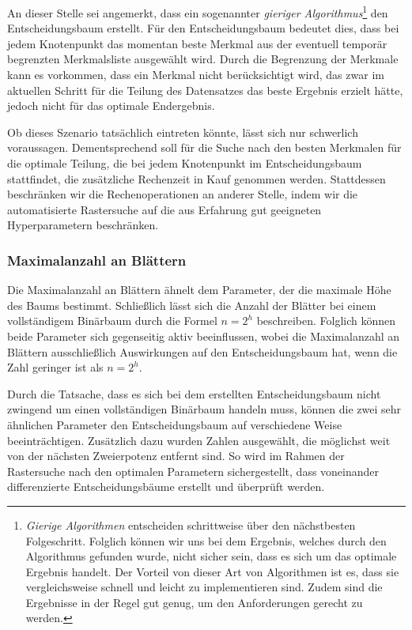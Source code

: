 \documentclass[12pt, a4paper]{article}
\begin{document}
An dieser Stelle sei angemerkt, dass ein sogenannter \textit{gieriger Algorithmus}\footnote{\textit{Gierige Algorithmen} entscheiden schrittweise über den nächstbesten Folgeschritt. Folglich können wir uns bei dem Ergebnis, welches durch den Algorithmus gefunden wurde, nicht sicher sein, dass es sich um das optimale Ergebnis handelt. Der Vorteil von dieser Art von Algorithmen ist es, dass sie vergleichsweise schnell und leicht zu implementieren sind. Zudem sind die Ergebnisse in der Regel gut genug, um den Anforderungen gerecht zu werden.} den Entscheidungsbaum erstellt. Für den Entscheidungsbaum bedeutet dies, dass bei jedem Knotenpunkt das momentan beste Merkmal aus der eventuell temporär begrenzten Merkmalsliste ausgewählt wird. Durch die Begrenzung der Merkmale kann es vorkommen, dass ein Merkmal nicht berücksichtigt wird, das zwar im aktuellen Schritt für die Teilung des Datensatzes das beste Ergebnis erzielt hätte, jedoch nicht für das optimale Endergebnis.

Ob dieses Szenario tatsächlich eintreten könnte, lässt sich nur schwerlich voraussagen. Dementsprechend soll für die Suche nach den besten Merkmalen für die optimale Teilung, die bei jedem Knotenpunkt im Entscheidungsbaum stattfindet, die zusätzliche Rechenzeit in Kauf genommen werden. Stattdessen beschränken wir die Rechenoperationen an anderer Stelle, indem wir die automatisierte Rastersuche auf die aus Erfahrung gut geeigneten Hyperparametern beschränken.

\subsubsection{Maximalanzahl an Blättern}

Die Maximalanzahl an Blättern ähnelt dem Parameter, der die maximale Höhe des Baums bestimmt. Schließlich lässt sich die Anzahl der Blätter bei einem vollständigem Binärbaum durch die Formel $n=2^h$ beschreiben. Folglich können beide Parameter sich gegenseitig aktiv beeinflussen, wobei die Maximalanzahl an Blättern ausschließlich Auswirkungen auf den Entscheidungsbaum hat, wenn die Zahl geringer ist als $n=2^h$.

Durch die Tatsache, dass es sich bei dem erstellten Entscheidungsbaum nicht zwingend um einen vollständigen Binärbaum handeln muss, können die zwei sehr ähnlichen Parameter den Entscheidungsbaum auf verschiedene Weise beeinträchtigen.
Zusätzlich dazu wurden Zahlen ausgewählt, die möglichst weit von der nächsten Zweierpotenz entfernt sind. So wird im Rahmen der Rastersuche nach den optimalen Parametern sichergestellt, dass voneinander differenzierte Entscheidungsbäume erstellt und überprüft werden.
\end{document}
